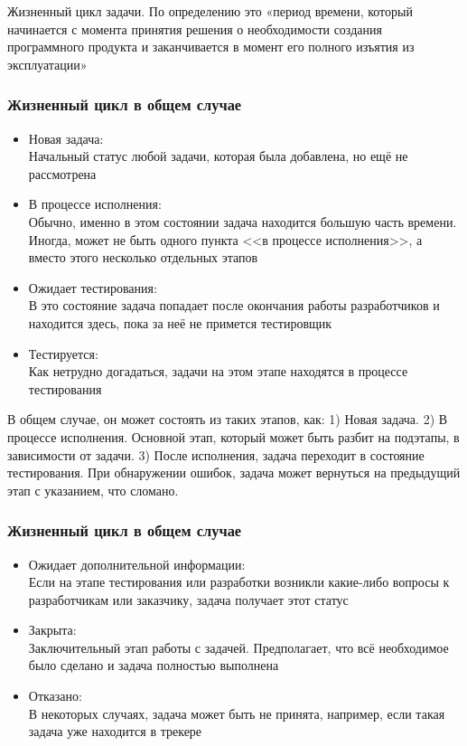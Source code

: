 \documentclass{../industrial-development}
\begin{document}
\lecturenotes
Жизненный цикл задачи. По определению это «период времени, который начинается с момента принятия решения о необходимости создания программного продукта и заканчивается в момент его полного изъятия из эксплуатации»

\begin{frame} \frametitle{Жизненный цикл в общем случае}
	\begin{itemize}
		\item Новая задача:\\
		Начальный статус любой задачи, которая была добавлена, но ещё не рассмотрена
		\item В процессе исполнения:\\
		Обычно, именно в этом состоянии задача находится большую часть времени. Иногда, может не быть одного пункта <<в процессе исполнения>>, а вместо этого несколько отдельных этапов
		\item Ожидает тестирования:\\
		В это состояние задача попадает после окончания работы разработчиков и находится здесь, пока за неё не примется тестировщик
		\item Тестируется:\\
		Как нетрудно догадаться, задачи на этом этапе находятся в процессе тестирования
		\end{itemize}
\end{frame}

\lecturenotes
В общем случае, он может состоять из таких этапов, как:
1) Новая задача.
2) В процессе исполнения. Основной этап, который может быть разбит на подэтапы, в зависимости от задачи.
3) После исполнения, задача переходит в состояние тестирования. При обнаружении ошибок, задача может вернуться на предыдущий этап с указанием, что сломано.

\begin{frame} \frametitle{Жизненный цикл в общем случае}
	\begin{itemize}		
		\item Ожидает дополнительной информации:\\
		Если на этапе тестирования или разработки возникли какие-либо вопросы к разработчикам или заказчику, задача получает этот статус
		\item Закрыта:\\
		Заключительный этап работы с задачей. Предполагает, что всё необходимое было сделано и задача полностью выполнена
		\item Отказано:\\
		В некоторых случаях, задача может быть не принята, например, если такая задача уже находится в трекере
	\end{itemize}
\end{frame}
\end{document}
